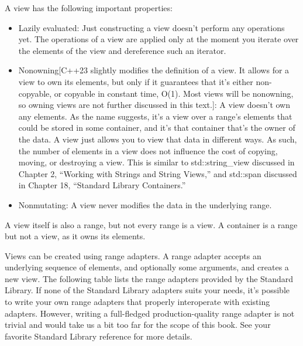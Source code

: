 A view has the following important properties:

\begin{itemize}
\item
Lazily evaluated: Just constructing a view doesn’t perform any operations yet. The operations of a view are applied only at the moment you iterate over the elements of the view and dereference such an iterator.

\item
Nonowning[C++23 slightly modifies the definition of a view. It allows for a view to own its elements, but only if it guarantees that it’s either non-copyable, or copyable in constant time, O(1). Most views will be nonowning, so owning views are not further discussed in this text.]: A view doesn’t own any elements. As the name suggests, it’s a view over a range’s elements that could be stored in some container, and it’s that container that’s the owner of the data. A view just allows you to view that data in different ways. As such, the number of elements in a view does not influence the cost of copying, moving, or destroying a view. This is similar to std::string\_view discussed in Chapter 2, “Working with Strings and String Views,” and std::span discussed in Chapter 18, “Standard Library Containers.”

\item
Nonmutating: A view never modifies the data in the underlying range.
\end{itemize}

A view itself is also a range, but not every range is a view. A container is a range but not a view, as it owns its elements.

Views can be created using range adapters. A range adapter accepts an underlying sequence of elements, and optionally some arguments, and creates a new view. The following table lists the range adapters provided by the Standard Library. If none of the Standard Library adapters suits your needs, it’s possible to write your own range adapters that properly interoperate with existing adapters. However, writing a full-fledged production-quality range adapter is not trivial and would take us a bit too far for the scope of this book. See your favorite Standard Library reference for more details.








